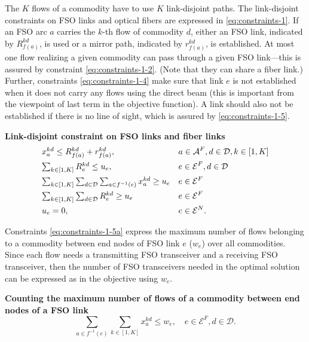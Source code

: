 \documentclass[onecolumn,11pt,draftclsnofoot]{IEEEtran}
\begin{document}
The $K$ flows of a commodity have to use $K$ link-disjoint paths. The link-disjoint constraints on  FSO links and  optical fibers are expressed in \eqref{eq:constraints-1}. If an FSO arc $a$ carries the $k$-th flow of commodity $d$, either an FSO link, indicated by $R^{kd}_{f(a)}$, is used or a mirror path, indicated by $r_{f(a)}^{kd}$, is established. At most one flow realizing a given commodity can pass through a given FSO link---this is assured by constraint \eqref{eq:constraints-1-2}. (Note that they can share a fiber link.) Further, constraints \eqref{eq:constraints-1-4} make sure that link $e$ is not established when it does not carry any flows using the direct beam
(this is important from the viewpoint of last term in the objective function). A link should also not be established if there is no line of sight, which is assured by \eqref{eq:constraints-1-5}.

\noindent \textbf{Link-disjoint constraint on FSO links and fiber links}
\begin{subequations}\label{eq:constraints-1}
\begin{align}
&\mbox{$ x_{a}^{kd} \le R^{kd}_{f(a)} + r_{f(a)}^{kd}$},  && a \in \mathcal A^F, d \in \mathcal D, k \in [1,K] \label{eq:constraints-1-1}\\
&\mbox{$ \sum_{k \in [1,K]} R^{kd}_{e} \le u_e$},  && e \in \mathcal E^F, d \in \mathcal D \label{eq:constraints-1-2}\\
&\mbox{$ \sum_{k \in [1,K]} \sum_{d \in \mathcal D} \sum_{a \in f^{-1}(e)} x_{a}^{kd} \ge u_e $} && e \in \mathcal E^F \label{eq:constraints-1-4}\\
&\mbox{$ \sum_{k \in [1,K]} \sum_{d \in \mathcal D} R_{e}^{kd} \ge u_e $} && e \in \mathcal E^F \label{eq:constraints-1-4}\\
& \mbox{$u_e = 0$},  &&  e \in \mathcal E^N. \label{eq:constraints-1-5}
\end{align}
\end{subequations}

Constraints \eqref{eq:constraints-1-5a} express the maximum number of flows belonging to a commodity between end nodes of FSO link $e$ ($w_e$) over all commodities. Since each flow needs a transmitting FSO transceiver and a receiving FSO transceiver, then the number of FSO transceivers needed in the optimal solution can be expressed as in the objective using $w_e$.

\noindent \textbf{Counting the maximum number of flows of a commodity between end nodes of a FSO link}
\begin{equation}\label{eq:constraints-1-5a}
\mbox{$\sum_{a \in f^{-1}(e)} \sum_{k \in [1,K]} x_{a}^{kd} \le w_{e}$}, \quad  e \in \mathcal E^F, d \in \mathcal D.
\end{equation}
\end{document}
